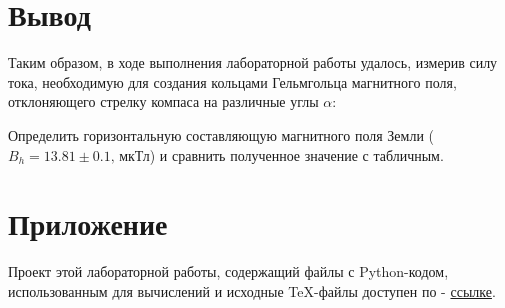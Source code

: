 \documentclass[12pt, a4paper]{article}
\begin{document}
\section{Вывод}
Таким образом, в ходе выполнения лабораторной работы удалось, измерив силу тока, необходимую для создания кольцами Гельмгольца магнитного поля, отклоняющего стрелку компаса на различные углы $\alpha$:

Определить горизонтальную составляющую магнитного поля Земли ($B_h = 13.81 \pm 0.1 \text{, мкТл}$) и сравнить полученное значение с табличным.

\section{Приложение}
Проект этой лабораторной работы, содержащий файлы с Python-кодом, использованным для вычислений и исходные TeX-файлы доступен по - \href{https://github.com/Dimankarp/Studies/tree/main/LaTeX/Physics%20-%20Earth%20Magnetism}{ссылке}.
\end{document}
